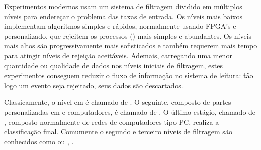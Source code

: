 Experimentos modernos usam um sistema de filtragem dividido em múltiplos
níveis para endereçar o problema das taxas de entrada. Os níveis mais baixos
implementam algoritmos simples e rápidos, normalmente usando FPGA's e
 personalizado, que rejeitem os processos ()
mais simples e abundantes. Os níveis mais altos são progressivamente mais
sofisticados e também requerem mais tempo para atingir níveis de rejeição
aceitáveis. Ademais, carregando uma menor quantidade ou qualidade de dados nos
níveis iniciais de filtragem, estes experimentos conseguem reduzir o fluxo de
informação no sistema de leitura: tão logo um evento seja rejeitado, seus
dados são descartados.

Classicamente, o nível em  é chamado de . O
seguinte, composto de partes personalizadas em  e computadores,
é chamado de . O último estágio, chamado de
, composto normalmente de redes de computadores
tipo PC, realiza a classificação final. Comumente o segundo e terceiro níveis
de filtragem são conhecidos como  ou
, .
